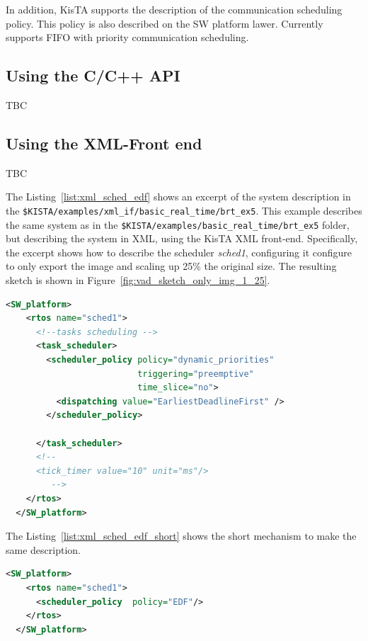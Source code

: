 In addition, KisTA supports the description of the communication scheduling policy.
This policy is also described on the SW platform lawer. 
Currently supports FIFO with priority communication scheduling.

\subsection{Using the C/C++ API}
TBC


\subsection{Using the XML-Front end}
TBC

The Listing~\ref{list:xml_sched_edf} shows an excerpt of the system description
in the \texttt{\$KISTA/examples/xml\_if/basic\_real\_time/brt\_ex5}.
This example describes the same system as in the 
\texttt{\$KISTA/examples/basic\_real\_time/brt\_ex5} folder,
but describing the system in XML, using the KisTA XML front-end.
%
Specifically, the excerpt shows how to describe the scheduler \emph{sched1},
configuring it 
configure to only export the image and scaling up 25\% the original size.
The resulting sketch is shown in Figure~\ref{fig:vad_sketch_only_img_1_25}.

\begin{lstlisting}[language=XML, caption={Describing a scheduler with EDF policy.}, label=list:xml_sched_edf]
  <SW_platform>
    <rtos name="sched1">
      <!--tasks scheduling -->
      <task_scheduler>
        <scheduler_policy policy="dynamic_priorities"
                          triggering="preemptive"
                          time_slice="no">
          <dispatching value="EarliestDeadlineFirst" />
        </scheduler_policy>

      </task_scheduler>
      <!--
	  <tick_timer value="10" unit="ms"/>
         -->  
    </rtos>
  </SW_platform>
\end{lstlisting}

The Listing~\ref{list:xml_sched_edf_short} shows the short mechanism to make the same description.

\begin{lstlisting}[language=XML, caption={Describing a scheduler with EDF policy.}, label=list:xml_sched_edf_short]
  <SW_platform>
    <rtos name="sched1">
      <scheduler_policy  policy="EDF"/>
    </rtos>
  </SW_platform>
\end{lstlisting}

